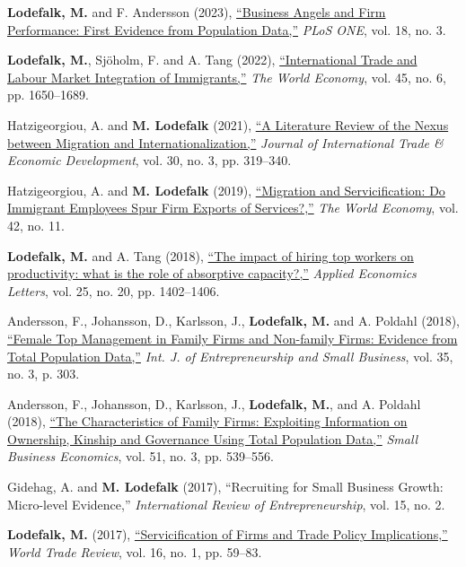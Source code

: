 \documentclass[11pt,a4paper]{article}
\newcommand{\name}[1]{\textbf{#1}}
\newcommand{\publication}[1]{\item #1}
\begin{document}
\begin{enumerate}[label={[\arabic*]}]
\publication{\name{Lodefalk, M.} and F. Andersson (2023), \href{https://doi.org/10.1371/journal.pone.0283690}{``Business Angels and Firm Performance: First Evidence from Population Data,''} \textit{PLoS ONE}, vol. 18, no. 3.}

\publication{\name{Lodefalk, M.}, Sjöholm, F. and A. Tang (2022), \href{https://doi.org/10.1111/twec.13240}{``International Trade and Labour Market Integration of Immigrants,''} \textit{The World Economy}, vol. 45, no. 6, pp. 1650--1689.}

\publication{Hatzigeorgiou, A. and \name{M. Lodefalk} (2021), \href{https://doi.org/10.1080/09638199.2021.1878257}{``A Literature Review of the Nexus between Migration and Internationalization,''} \textit{Journal of International Trade \& Economic Development}, vol. 30, no. 3, pp. 319--340.}

\publication{Hatzigeorgiou, A. and \name{M. Lodefalk} (2019), \href{https://doi.org/10.1111/twec.12838}{``Migration and Servicification: Do Immigrant Employees Spur Firm Exports of Services?,''} \textit{The World Economy}, vol. 42, no. 11.}

\publication{\name{Lodefalk, M.} and A. Tang (2018), \href{https://doi.org/10.1080/13504851.2017.1422594}{``The impact of hiring top workers on productivity: what is the role of absorptive capacity?,''} \textit{Applied Economics Letters}, vol. 25, no. 20, pp. 1402--1406.}

\publication{Andersson, F., Johansson, D., Karlsson, J., \name{Lodefalk, M.} and A. Poldahl (2018), \href{https://doi.org/10.1504/ijesb.2018.095903}{``Female Top Management in Family Firms and Non-family Firms: Evidence from Total Population Data,''} \textit{Int. J. of Entrepreneurship and Small Business}, vol. 35, no. 3, p. 303.}

\publication{Andersson, F., Johansson, D., Karlsson, J., \name{Lodefalk, M.}, and A. Poldahl (2018), \href{https://doi.org/10.1007/s11187-017-9947-6}{``The Characteristics of Family Firms: Exploiting Information on Ownership, Kinship and Governance Using Total Population Data,''} \textit{Small Business Economics}, vol. 51, no. 3, pp. 539--556.}

\publication{Gidehag, A. and \name{M. Lodefalk} (2017), ``Recruiting for Small Business Growth: Micro-level Evidence,'' \textit{International Review of Entrepreneurship}, vol. 15, no. 2.}

\publication{\name{Lodefalk, M.} (2017), \href{https://doi.org/10.1017/s147474561600029x}{``Servicification of Firms and Trade Policy Implications,''} \textit{World Trade Review}, vol. 16, no. 1, pp. 59--83.}


\end{enumerate}
\end{document}
